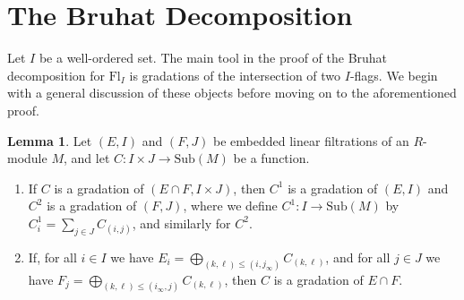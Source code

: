 \documentclass[oneside,11pt]{amsart}
\newcommand{\Fl}{\ensuremath{\text{Fl}}}
\newcommand{\Sub}{\ensuremath{\text{Sub}}}
\theoremstyle{definition}
\newtheorem{proof techniques}{Proof Techniques}
\newtheorem{lemma}{Lemma}
\begin{document}


\section{The Bruhat Decomposition}\label{sec: the bruhat decomposition}\label{sec: the bruhat decomposition}

Let $I$ be a well-ordered set. The main tool in the proof of the Bruhat decomposition for $\Fl_I$ is gradations of the intersection of two $I$-flags. We begin with a general discussion of these objects before moving on to the aforementioned proof. 



\begin{lemma}\label{lem: a gradation of the intersection gives a gradation of each filtration}
Let $(E , I)$ and $(F , J)$ be embedded linear filtrations of an $R$-module $M$, and let $C: I \times J \to \Sub(M)$ be a function. 

\begin{enumerate}

\item If $C$ is a gradation of $(E \cap F , I \times J)$, then $C^1$ is a gradation of $(E , I)$ and $C^2$ is a gradation of $(F , J)$, where we define $C^1 : I \to \Sub(M)$ by $C^1_i = \sum_{j \in J} C_{(i , j)}$, and similarly for $C^2$. 

\item If, for all $i \in I$ we have $E_i = \bigoplus_{(k , \ell) \leq (i , j_{\infty})} C_{(k , \ell)}$, and for all $j \in J$ we have $F_j = \bigoplus_{(k , \ell) \leq (i_{\infty} , j)} C_{(k , \ell)}$, then $C$ is a gradation of $E \cap F$. 

\end{enumerate}
\end{lemma}
\end{document}
